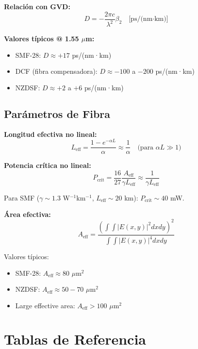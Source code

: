 \documentclass[11pt,a4paper]{article}
\begin{document}
\textbf{Relación con GVD:}
\begin{equation}
    D = -\frac{2\pi c}{\lambda^2}\beta_2 \quad \text{[ps/(nm·km)]}
\end{equation}

\textbf{Valores típicos @ 1.55 $\mu$m:}
\begin{itemize}
    \item SMF-28: $D \approx +17$ ps/(nm·km)
    \item DCF (fibra compensadora): $D \approx -100$ a $-200$ ps/(nm·km)
    \item NZDSF: $D \approx +2$ a $+6$ ps/(nm·km)
\end{itemize}

\subsection{Parámetros de Fibra}

\textbf{Longitud efectiva no lineal:}
\begin{equation}
    L_{\text{eff}} = \frac{1 - e^{-\alpha L}}{\alpha} \approx \frac{1}{\alpha} \quad \text{(para } \alpha L \gg 1\text{)}
\end{equation}

\textbf{Potencia crítica no lineal:}
\begin{equation}
    P_{\text{crit}} = \frac{16}{27}\frac{A_{\text{eff}}}{\gamma L_{\text{eff}}} \approx \frac{1}{\gamma L_{\text{eff}}}
\end{equation}

Para SMF ($\gamma \sim 1.3$ W$^{-1}$km$^{-1}$, $L_{\text{eff}} \sim 20$ km): $P_{\text{crit}} \sim 40$ mW.

\textbf{Área efectiva:}
\begin{equation}
    A_{\text{eff}} = \frac{\left(\int\int |E(x,y)|^2 dx dy\right)^2}{\int\int |E(x,y)|^4 dx dy}
\end{equation}

Valores típicos:
\begin{itemize}
    \item SMF-28: $A_{\text{eff}} \approx 80$ $\mu$m$^2$
    \item NZDSF: $A_{\text{eff}} \approx 50-70$ $\mu$m$^2$
    \item Large effective area: $A_{\text{eff}} > 100$ $\mu$m$^2$
\end{itemize}

\section{Tablas de Referencia}
\end{document}
